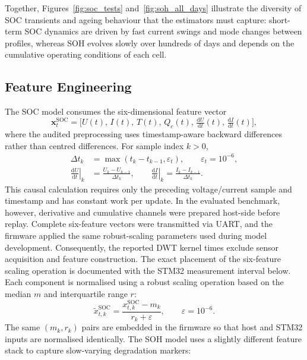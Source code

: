 \documentclass[final,3p,times]{elsarticle}
\begin{document}
\noindent
Together, Figures~\ref{fig:soc_tests} and~\ref{fig:soh_all_days} illustrate the diversity of SOC transients and ageing behaviour that the estimators must capture: short-term SOC dynamics are driven by fast current swings and mode changes between profiles, whereas SOH evolves slowly over hundreds of days and depends on the cumulative operating conditions of each cell.
\subsection{Feature Engineering}
The SOC model consumes the six-dimensional feature vector
\begin{equation}
    \mathbf{x}^{\mathrm{SOC}}_t = \bigl[U(t),\, I(t),\, T(t),\, Q_c(t),\, \tfrac{\mathrm{d}U}{\mathrm{d}t}(t),\, \tfrac{\mathrm{d}I}{\mathrm{d}t}(t)\bigr],
\end{equation}
where the audited preprocessing uses timestamp-aware backward differences rather than centred differences. For sample index $k>0$,
\begin{align}
    \Delta t_k &= \max(t_k-t_{k-1},\varepsilon_t), \qquad \varepsilon_t=10^{-6},\label{eq:feature_dt}\\
    \left.\frac{\mathrm{d}U}{\mathrm{d}t}\right|_k &= \frac{U_k-U_{k-1}}{\Delta t_k}, \qquad
    \left.\frac{\mathrm{d}I}{\mathrm{d}t}\right|_k = \frac{I_k-I_{k-1}}{\Delta t_k}.\label{eq:feature_backward_difference}
\end{align}
This causal calculation requires only the preceding voltage/current sample and timestamp and has constant work per update. In the evaluated benchmark, however, derivative and cumulative channels were prepared host-side before replay. Complete six-feature vectors were transmitted via UART, and the firmware applied the same robust-scaling parameters used during model development. Consequently, the reported DWT kernel times exclude sensor acquisition and feature construction. The exact placement of the six-feature scaling operation is documented with the STM32 measurement interval below. Each component is normalised using a robust scaling operation based on the median $m$ and interquartile range $r$:
\begin{equation}
    \tilde{x}^{\mathrm{SOC}}_{t,k} = \frac{x^{\mathrm{SOC}}_{t,k} - m_k}{r_k + \varepsilon}, \qquad \varepsilon=10^{-6}.
\end{equation}
The same $(m_k,r_k)$ pairs are embedded in the firmware so that host and STM32 inputs are normalised identically.
The SOH model uses a slightly different feature stack to capture slow-varying degradation markers:
\end{document}
